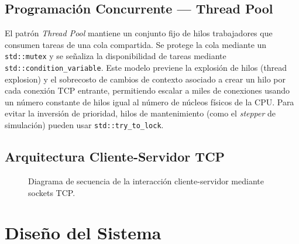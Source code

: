\documentclass[12pt,letterpaper]{article}
\begin{document}
\subsection{Programación Concurrente --- Thread Pool}
El patrón \textit{Thread Pool} mantiene un conjunto fijo de hilos trabajadores que consumen tareas de una cola compartida. Se protege la cola mediante un \texttt{std::mutex} y se señaliza la disponibilidad de tareas mediante \texttt{std::condition\_variable}. Este modelo previene la explosión de hilos (thread explosion) y el sobrecosto de cambios de contexto asociado a crear un hilo por cada conexión TCP entrante, permitiendo escalar a miles de conexiones usando un número constante de hilos igual al número de núcleos físicos de la CPU. Para evitar la inversión de prioridad, hilos de mantenimiento (como el \textit{stepper} de simulación) pueden usar \texttt{std::try\_to\_lock}. \subsection{Arquitectura Cliente-Servidor TCP}

\begin{figure}[H]
\centering
{}
\caption{Diagrama de secuencia de la interacción cliente-servidor mediante sockets TCP.}
\label{fig:tcp_seq}
\end{figure}\newpage
\section{Diseño del Sistema}
\end{document}
